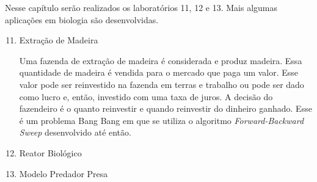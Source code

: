 Nesse capítulo serão realizados os laboratórios 11, 12 e 13. Mais algumas
aplicações em biologia são desenvolvidas.

\begin{enumerate}[label=\textbf{Lab \arabic*:}]
    \setcounter{enumi}{10}

    \item Extração de Madeira
    
    Uma fazenda de extração de madeira é considerada e produz madeira. Essa
    quantidade de madeira é vendida para o mercado que paga um valor. Esse
    valor pode ser reinvestido na fazenda em terras e trabalho ou pode ser
    dado como lucro e, então, investido com uma taxa de juros. A decisão do
    fazendeiro é o quanto reinvestir e quando reinvestir do dinheiro ganhado.
    Esse é um problema Bang Bang em que se utiliza o algoritmo
    \textit{Forward-Backward Sweep} desenvolvido até então. 

    \item Reator Biológico 
    
    \item Modelo Predador Presa 

\end{enumerate}